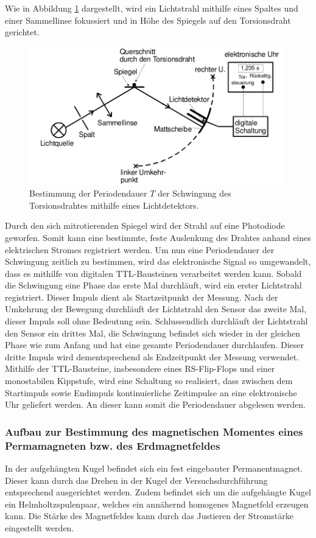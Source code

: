 Wie in Abbildung \ref{fig:d2} dargestellt, wird ein Lichtstrahl mithilfe eines Spaltes und einer Sammellinse fokussiert und in Höhe des Spiegels auf den Torsionsdraht gerichtet.
\begin{figure}[H]
  \centering
  \includegraphics[height=6cm]{aufbau2.png}
  \caption{Bestimmung der Periodendauer $T$ der Schwingung des Torsionsdrahtes mithilfe eines Lichtdetektors. \cite{sample}}
  \label{fig:d2}
\end{figure}
Durch den sich mitrotierenden Spiegel wird der Strahl auf eine Photodiode geworfen.
Somit kann eine bestimmte, feste Auslenkung des Drahtes anhand eines elektrischen Stromes registriert werden.
Um nun eine Periodendauer der Schwingung zeitlich zu bestimmen, wird das elektronische Signal so umgewandelt, dass es mithilfe von digitalen TTL-Bausteinen verarbeitet werden kann.
Sobald die Schwingung eine Phase das erste Mal durchläuft, wird ein erster Lichtstrahl registriert.
Dieser Impuls dient als Startzeitpunkt der Messung.
Nach der Umkehrung der Bewegung durchläuft der Lichtstrahl den Sensor das zweite Mal, dieser Impuls soll ohne Bedeutung sein.
Schlussendlich durchläuft der Lichtstrahl den Sensor ein drittes Mal, die Schwingung befindet sich wieder in der gleichen Phase wie zum Anfang und hat eine gesamte Periodendauer durchlaufen.
Dieser dritte Impuls wird dementsprechend als Endzeitpunkt der Messung verwendet.
Mithilfe der TTL-Bausteine, insbesondere eines RS-Flip-Flops und einer monostabilen Kippstufe, wird eine Schaltung so realisiert, dass zwischen dem Startimpuls sowie Endimpuls kontinuierliche Zeitimpulse an eine elektronische Uhr geliefert werden.
An dieser kann somit die Periodendauer abgelesen werden.\\
\subsubsection{Aufbau zur Bestimmung des magnetischen Momentes eines Permamagneten bzw. des Erdmagnetfeldes}
In der aufgehängten Kugel befindet sich ein fest eingebauter Permanentmagnet.
Dieser kann durch das Drehen in der Kugel der Versuchsdurchführung entsprechend ausgerichtet werden.
Zudem befindet sich um die aufgehängte Kugel ein Helmholtzspulenpaar, welches ein annähernd homogenes Magnetfeld erzeugen kann.
Die Stärke des Magnetfeldes kann durch das Justieren der Stromstärke eingestellt werden.

